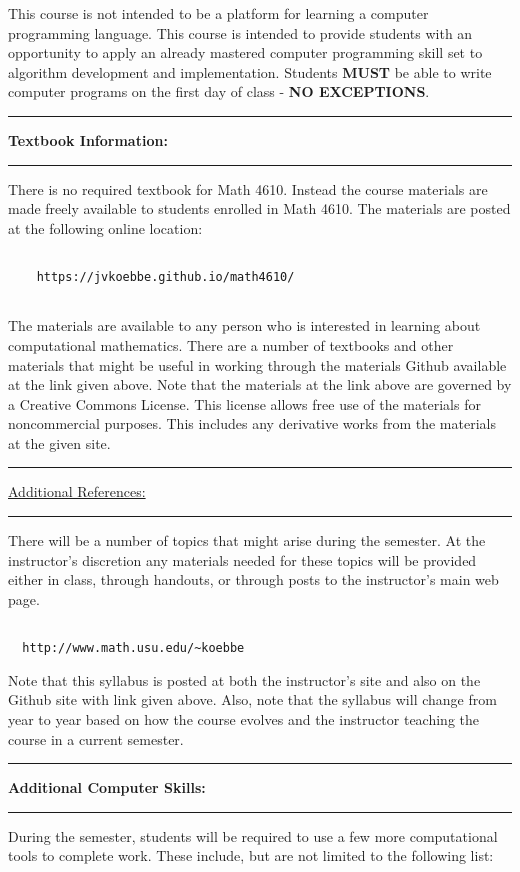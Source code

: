 \documentclass[10pt,fleqn]{article}
\begin{document}
This course is not intended to be a platform for learning a computer programming
language. This course is intended to provide students with an opportunity to
apply an already mastered computer programming skill set to algorithm
development and implementation. Students {\bf MUST} be able to write computer
programs on the first day of class - {\bf NO EXCEPTIONS}.
\vskip0.1in\hrule\vskip0.1in
\noindent
{\bf Textbook Information:}
\vskip0.1in\hrule\vskip0.1in
\noindent
There is no required textbook for Math 4610. Instead the course materials are
made freely available to students enrolled in Math 4610. The materials are
posted at the following online location:
\begin{verbatim}

    https://jvkoebbe.github.io/math4610/
 
\end{verbatim}
\noindent
The materials are available to any person who is interested in learning about
computational mathematics. There are a number of textbooks and other materials
that might be useful in working through the materials Github available at the
link given above. Note that the materials at the link above are governed by a
Creative Commons License. This license allows free use of the materials for
noncommercial purposes. This includes any derivative works from the materials at
the given site.
\vskip0.1in\hrule\vskip0.1in
\noindent
\underline{Additional References:}
\vskip0.1in\hrule\vskip0.1in
\noindent
There will be a number of topics that might arise during the semester. At the
instructor's discretion any materials needed for these topics will be provided
either in class, through handouts, or through posts to the instructor's main
web page.
\begin{verbatim}

  http://www.math.usu.edu/~koebbe

\end{verbatim}
Note that this syllabus is posted at both the instructor's site and also on the
Github site with link given above. Also, note that the syllabus will change from
year to year based on how the course evolves and the instructor teaching the
course in a current semester.
\vskip0.1in\hrule\vskip0.1in \noindent
{\bf Additional Computer Skills:}
\vskip0.1in\hrule\vskip0.1in
\noindent
During the semester, students will be required to use a few more computational
tools to complete work. These include, but are not limited to the following
list:
\end{document}
